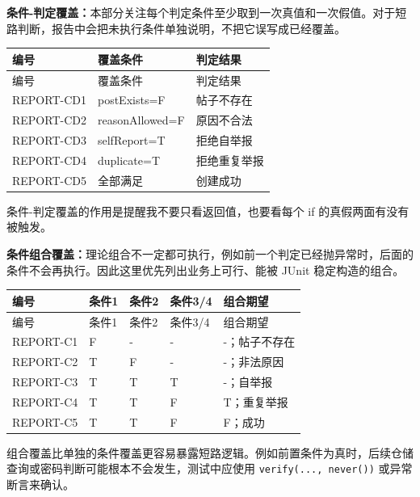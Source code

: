 \documentclass[bwprint]{report}
\begin{document}
\textbf{条件-判定覆盖：}本部分关注每个判定条件至少取到一次真值和一次假值。对于短路判断，报告中会把未执行条件单独说明，不把它误写成已经覆盖。
{
\setlength{\tabcolsep}{3pt}
\begin{longtable}{P{2.4cm}P{5.0cm}P{5.8cm}}
\toprule
编号 & 覆盖条件 & 判定结果\\
\midrule
\endfirsthead
\toprule
编号 & 覆盖条件 & 判定结果\\
\midrule
\endhead
REPORT-\hspace{0pt}CD1 & post\hspace{0pt}Exists=\hspace{0pt}F & 帖子不存在 \\
REPORT-\hspace{0pt}CD2 & reason\hspace{0pt}Allowed=\hspace{0pt}F & 原因不合法 \\
REPORT-\hspace{0pt}CD3 & self\hspace{0pt}Report=\hspace{0pt}T & 拒绝自举报 \\
REPORT-\hspace{0pt}CD4 & duplicate=\hspace{0pt}T & 拒绝重复举报 \\
REPORT-\hspace{0pt}CD5 & 全部满足 & 创建成功 \\
\bottomrule
\end{longtable}
}
条件-判定覆盖的作用是提醒我不要只看返回值，也要看每个 if 的真假两面有没有被触发。

\textbf{条件组合覆盖：}理论组合不一定都可执行，例如前一个判定已经抛异常时，后面的条件不会再执行。因此这里优先列出业务上可行、能被 JUnit 稳定构造的组合。
{
\setlength{\tabcolsep}{3pt}
\begin{longtable}{P{2.4cm}P{2.0cm}P{2.0cm}P{2.0cm}P{4.1cm}}
\toprule
编号 & 条件1 & 条件2 & 条件3/4 & 组合期望\\
\midrule
\endfirsthead
\toprule
编号 & 条件1 & 条件2 & 条件3/4 & 组合期望\\
\midrule
\endhead
REPORT-\hspace{0pt}C1 & F & - & - & -；帖子不存在 \\
REPORT-\hspace{0pt}C2 & T & F & - & -；非法原因 \\
REPORT-\hspace{0pt}C3 & T & T & T & -；自举报 \\
REPORT-\hspace{0pt}C4 & T & T & F & T；重复举报 \\
REPORT-\hspace{0pt}C5 & T & T & F & F；成功 \\
\bottomrule
\end{longtable}
}
组合覆盖比单独的条件覆盖更容易暴露短路逻辑。例如前置条件为真时，后续仓储查询或密码判断可能根本不会发生，测试中应使用 \texttt{verify(..., never())} 或异常断言来确认。
\end{document}
